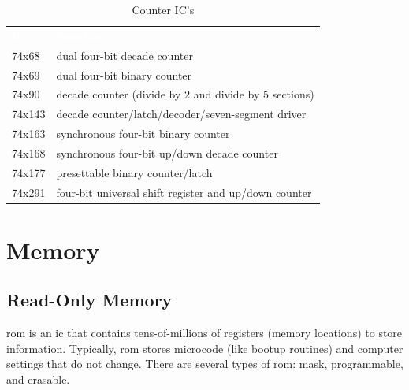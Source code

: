 \begin{table}[H]
  \sffamily
  \newcommand{\head}[1]{\textcolor{white}{\textbf{#1}}}    
  \begin{center}
    \begin{tabular}{ll} 
      \rowcolor{black!75}
      \head{IC} & \head{Function} \\
      74x68 & dual four-bit decade counter \\
      74x69 & dual four-bit binary counter \\
      74x90 & decade counter (divide by $ 2 $ and divide by $ 5 $ sections) \\
      74x143 & decade counter/latch/decoder/seven-segment driver \\
      74x163 & synchronous four-bit binary counter \\
      74x168 & synchronous four-bit up/down decade counter \\
      74x177 & presettable binary counter/latch \\
      74x291 & four-bit universal shift register and up/down counter
    \end{tabular}
  \end{center}
  \caption{Counter IC's}
  \label{sl:tab:counter_ics}
\end{table}

\section{Memory}
\label{SL:sec:memory}

\subsection{Read-Only Memory}
\label{SL:subsec:read-only_memory}

\gls{rom} is an \gls{ic} that contains tens-of-millions of registers (memory locations) to store information. Typically, \gls{rom} stores microcode (like bootup routines) and computer settings that do not change. There are several types of \gls{rom}: mask, programmable, and erasable. 

